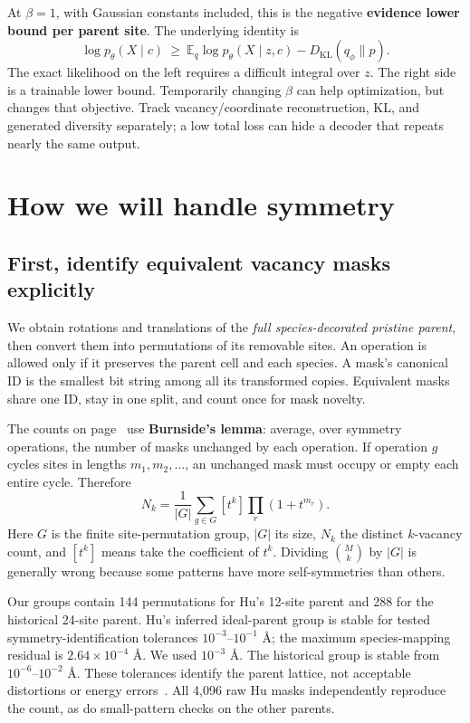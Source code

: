 At $\beta=1$, with Gaussian constants included, this is the negative \textbf{evidence lower bound per parent site}. The underlying identity is~\cite{cvae}
\[
 \log p_\theta(X\mid c)\ \ge\
 \mathbb E_q\log p_\theta(X\mid z,c)-D_{\mathrm{KL}}(q_\phi\|p).
\]
The exact likelihood on the left requires a difficult integral over $z$. The right side is a trainable lower bound. Temporarily changing $\beta$ can help optimization, but changes that objective. Track vacancy/coordinate reconstruction, KL, and generated diversity separately; a low total loss can hide a decoder that repeats nearly the same output.

\clearpage
\section{How we will handle symmetry}\label{sec:symmetry}

\subsection*{First, identify equivalent vacancy masks explicitly}
We obtain rotations and translations of the \emph{full species-decorated pristine parent}, then convert them into permutations of its removable sites. An operation is allowed only if it preserves the parent cell and each species. A mask's canonical ID is the smallest bit string among all its transformed copies. Equivalent masks share one ID, stay in one split, and count once for mask novelty.

The counts on page~\pageref{sec:vacancies} use \textbf{Burnside's lemma}: average, over symmetry operations, the number of masks unchanged by each operation. If operation $g$ cycles sites in lengths $m_1,m_2,\ldots$, an unchanged mask must occupy or empty each entire cycle. Therefore
\[
 N_k=\frac{1}{|G|}\sum_{g\in G}[t^k]\prod_r(1+t^{m_r}).
\]
Here $G$ is the finite site-permutation group, $|G|$ its size, $N_k$ the distinct $k$-vacancy count, and $[t^k]$ means take the coefficient of $t^k$. Dividing $\binom{M}{k}$ by $|G|$ is generally wrong because some patterns have more self-symmetries than others.

Our groups contain 144 permutations for Hu's 12-site parent and 288 for the historical 24-site parent. Hu's inferred ideal-parent group is stable for tested symmetry-identification tolerances $10^{-3}$--$10^{-1}$ \AA; the maximum species-mapping residual is $2.64\times10^{-4}$ \AA. We used $10^{-3}$ \AA. The historical group is stable from $10^{-6}$--$10^{-2}$ \AA. These tolerances identify the parent lattice, not acceptable distortions or energy errors~\cite{spglib}. All 4,096 raw Hu masks independently reproduce the count, as do small-pattern checks on the other parents.

